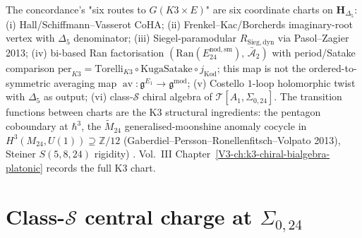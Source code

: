\begin{remark}
\label{rem:concord-3}
The concordance's "six routes to $G(K3\times E)$" are six coordinate
charts on $\mathbf H_{\Delta_5}$: (i) Hall/Schiffmann--Vasserot CoHA;
(ii) Frenkel--Kac/Borcherds imaginary-root vertex with $\Delta_5$
denominator; (iii) Siegel-paramodular $R_{\mathrm{Sieg,dyn}}$ via
Pasol--Zagier 2013; (iv) bi-based Ran factorisation
$(\mathrm{Ran}(E^{\mathrm{nod,sm}}_{24}),\,\bar{\mathcal A}_2)$
with period/Satake comparison
$\mathrm{per}_{K3}=\mathrm{Torelli}_{K3}\circ
\mathrm{KugaSatake}\circ j_{\mathrm{Kod}}$; this map is not the
ordered-to-symmetric averaging map
$\operatorname{av}\colon\mathfrak g^{E_1}\to\mathfrak g^{\mathrm{mod}}$;
(v) Costello $1$-loop holomorphic twist with $\Delta_5$ as output;
(vi) class-$\mathcal S$ chiral algebra of $\mathcal T[A_1,\Sigma_{0,24}]$.
The transition functions between charts are the K3 structural
ingredients: the pentagon coboundary at $\hbar^3$, the $\widetilde M_{24}$
generalised-moonshine anomaly cocycle in $H^3(M_{24},U(1))\supseteq\mathbb Z/12$
(Gaberdiel--Persson--Ronellenfitsch--Volpato 2013), Steiner $S(5,8,24)$
rigidity) \cite{PasolZagier2013,CostelloHolomorphic,ConwaySloane1988}.
Vol.~III Chapter~\ref{V3-ch:k3-chiral-bialgebra-platonic} records
the full K3 chart.
\end{remark}

\section{Class-\texorpdfstring{$\mathcal S$}{S} central charge at
\texorpdfstring{$\Sigma_{0,24}$}{Sigma 0,24}}
\label{sec:concord-central-charge-retraction}

